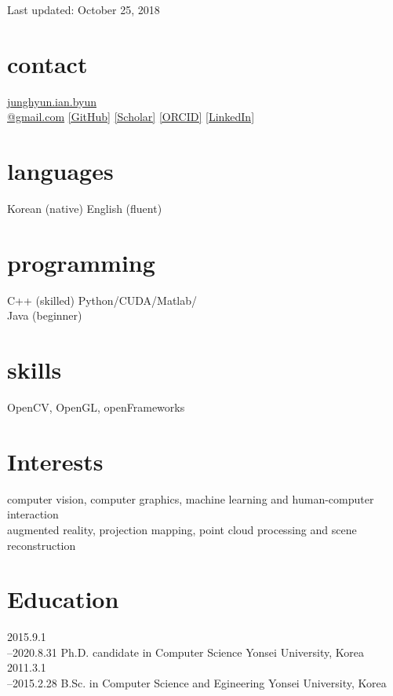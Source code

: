 \documentclass[]{friggeri-cv}
\begin{document}
       {Last updated: October 25, 2018}

\begin{aside}
  \section{contact}
    \href{mailto:junghyun.ian.byun@gmail.com}{junghyun.ian.byun\\@gmail.com}
    \href{https://github.com/IanByun}{[GitHub]}
    \href{https://scholar.google.co.kr/citations?user=JzneZIcAAAAJ}{[Scholar]}
    \href{https://orcid.org/0000-0002-1248-292X}{[ORCID]}
    \href{https://www.linkedin.com/in/junghyun-ian-byun/}{[LinkedIn]}
  \section{languages}
    Korean (native)
    English (fluent)
  \section{programming}
    C++ (skilled)
    Python/CUDA/Matlab/\\Java (beginner)
  \section{skills}
    OpenCV, OpenGL, openFrameworks
\end{aside}


\section{Interests}

computer vision, computer graphics, machine learning and human-computer interaction\\
augmented reality, projection mapping, point cloud processing and scene reconstruction

\section{Education}

\begin{entrylist}
  \entry
    {2015.9.1\\--2020.8.31}
    {Ph.D. {\normalfont candidate in Computer Science}}
    {Yonsei University, Korea}
    {}
  \entry
    {2011.3.1\\--2015.2.28}
    {B.Sc. {\normalfont in Computer Science and Egineering}}
    {Yonsei University, Korea}
    {}
\end{entrylist}
\end{document}
